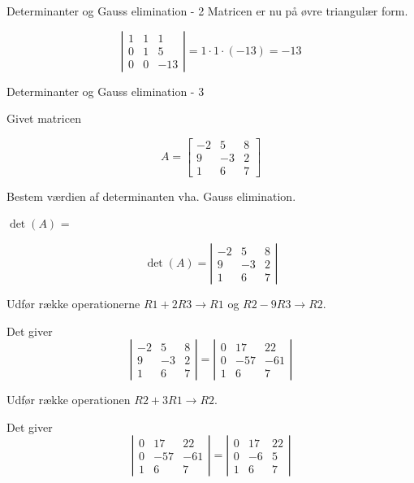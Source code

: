 \documentclass{article}
\begin{document}
\begin{exercise}{Determinanter og Gauss elimination - 2}
\hint
Matricen er nu på øvre triangulær form.

\hint
\[
\left|\begin{array}{rrr}
1 & 1 & 1 \\ 
0 & 1 & 5 \\
0 & 0 & -13
\end{array} \right|
= 1 \cdot 1 \cdot (-13) = -13
\]
	
\end{exercise}


\begin{exercise}{Determinanter og Gauss elimination - 3}
	
Givet matricen

\[
A = \left[\begin{array}{rrr}
-2 & 5 & 8 \\ 
9 & -3 & 2 \\
1 & 6 & 7
\end{array} \right]
\]

Bestem værdien af determinanten vha. Gauss elimination.

$\det(A)$ = 


\hint
\[
\det(A) = \left|\begin{array}{rrr}
-2 & 5 & 8 \\ 
9 & -3 & 2 \\
1 & 6 & 7
\end{array} \right|
\]


\hint
Udfør række operationerne
$R1 + 2R3 \to R1$ og
$R2 - 9R3 \to R2$.

\hint
Det giver 
\[
\left|\begin{array}{rrr}
-2 & 5 & 8 \\ 
9 & -3 & 2 \\
1 & 6 & 7
\end{array} \right|
=
\left|\begin{array}{rrr}
0 & 17 & 22 \\ 
0 & -57 & -61 \\
1 & 6 & 7
\end{array} \right|
\]

\hint
Udfør række operationen
$R2 + 3R1 \to R2$.

\hint
Det giver 
\[
\left|\begin{array}{rrr}
0 & 17 & 22 \\ 
0 & -57 & -61 \\
1 & 6 & 7
\end{array} \right|
=
\left|\begin{array}{rrr}
0 & 17 & 22 \\ 
0 & -6 & 5 \\
1 & 6 & 7
\end{array} \right|
\]


\end{exercise}
\end{document}

